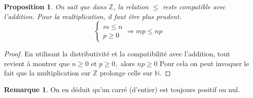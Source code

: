 \documentclass[french]{book}
\newcommand{\N}{\mathbb{N}}
\newcommand{\Z}{\mathbb{Z}}
\theoremstyle{plain}
\newtheorem{prop}{Proposition}[chapter]
\theoremstyle{definition}
\newtheorem{rmq}{Remarque}[chapter]
\theoremstyle{remark}
\begin{document}
\begin{prop}
	On sait que dans $\Z$, la relation $\leqslant$ reste compatible avec l'addition. Pour la multiplication, il faut être plus prudent.
$$\begin{cases}
	m\leqslant n\\
	p\geqslant0
\end{cases}\Rightarrow mp\leqslant np$$
\end{prop}
\begin{proof}
	En utilisant la distributivité et la compatibilité avec l'addition, tout revient à montrer que $n\geqslant0$ et $p\geqslant0,$ alors $np\geqslant0$ Pour cela on peut invoquer le fait que la multiplication sur $\Z$ prolonge celle sur $\N$.
\end{proof}
\begin{rmq}
	On en déduit qu'un carré (d'entier) est toujours positif ou nul.
\end{rmq}
\end{document}

